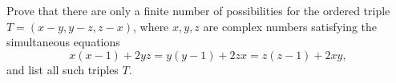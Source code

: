 Prove that there are only a finite number of possibilities for the
ordered triple $T=(x-y,y-z,z-x)$, where $x,y,z$ are complex numbers
satisfying the simultaneous equations
\[
x(x-1)+2yz = y(y-1)+2zx = z(z-1)+2xy,
\]
and list all such triples $T$.
